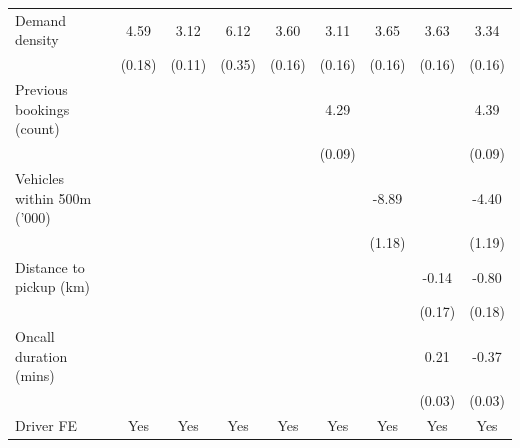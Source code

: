 \documentclass[reviewmode,AEJ]{AEA}
\begin{document}
\begin{appendices}
\begin{table}
{\begin{tabular}{l*{8}{S}}
            \addlinespace
            Demand density      &       4.59&       3.12&       6.12&       3.60&       3.11&       3.65&       3.63&       3.34\\
                                &     (0.18)         &     (0.11)         &     (0.35)         &     (0.16)         &     (0.16)         &     (0.16)         &     (0.16)         &     (0.16)         \\
            \addlinespace
            Previous bookings (count)&                     &                     &                     &                     &       4.29&                     &                     &       4.39\\
                                &                     &                     &                     &                     &     (0.09)         &                     &                     &     (0.09)         \\
            \addlinespace
            Vehicles within 500m ('000)&                     &                     &                     &                     &                     &      -8.89&                     &      -4.40\\
                                &                     &                     &                     &                     &                     &     (1.18)         &                     &     (1.19)         \\
            \addlinespace
            Distance to pickup (km)&                     &                     &                     &                     &                     &                     &      -0.14         &      -0.80\\
                                &                     &                     &                     &                     &                     &                     &     (0.17)         &     (0.18)         \\
            \addlinespace
            Oncall duration (mins)&                     &                     &                     &                     &                     &                     &       0.21&      -0.37\\
                                &                     &                     &                     &                     &                     &                     &     (0.03)         &     (0.03)         \\
            \addlinespace
            Driver FE           &       {Yes}         &       {Yes}         &       {Yes}         &       {Yes}         &       {Yes}         &       {Yes}         &       {Yes}         &       {Yes}         \\

\end{tabular}}
\end{table}
\end{appendices}
\end{document}
